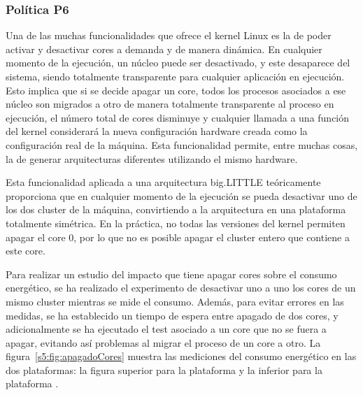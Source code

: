 \subsubsection{Política P6}
\label{sec:p6}
Una de las muchas funcionalidades que ofrece el kernel Linux es la de poder
activar y desactivar cores a demanda y de manera dinámica. En cualquier
momento de la ejecución, un núcleo puede ser desactivado, y este desaparece
del sistema, siendo totalmente transparente para cualquier aplicación en
ejecución. Esto implica que si se decide apagar un core, todos los procesos
asociados a ese núcleo son migrados a otro de manera totalmente
transparente al proceso en ejecución, el número total de cores disminuye y
cualquier llamada a una función del kernel considerará la nueva
configuración hardware creada como la configuración real de la
máquina. Esta funcionalidad permite, entre muchas cosas, la de generar
arquitecturas diferentes utilizando el mismo hardware.

Esta funcionalidad aplicada a una arquitectura big.LITTLE teóricamente
proporciona que en cualquier momento de la ejecución se pueda desactivar
uno de los dos cluster de la máquina, convirtiendo a la arquitectura en una
plataforma totalmente simétrica. En la práctica, no todas las versiones
del kernel permiten apagar el core 0, por lo que no es posible apagar el
cluster entero que contiene a este core.

Para realizar un estudio del impacto que tiene apagar cores sobre el
consumo energético, se ha realizado el experimento de desactivar uno a uno
los cores de un mismo cluster mientras se mide el consumo. Además, para
evitar errores en las medidas, se ha establecido un tiempo de espera entre
apagado de dos cores, y adicionalmente se ha ejecutado el test asociado a
un core que no se fuera a apagar, evitando así problemas al migrar el
proceso de un core a otro. La figura~\ref{s5:fig:apagadoCores} muestra las
mediciones del consumo energético en las dos plataformas: la figura
superior para la plataforma \juno y la inferior para la plataforma \odroid.


